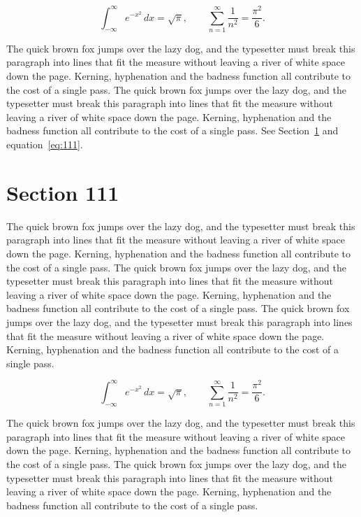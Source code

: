 \documentclass{article}
\begin{document}
\begin{equation}\label{eq:110}
\int_{-\infty}^{\infty} e^{-x^{2}}\,dx = \sqrt{\pi}, \qquad
\sum_{n=1}^{\infty} \frac{1}{n^{2}} = \frac{\pi^{2}}{6}.
\end{equation}

The quick brown fox jumps over the lazy dog, and the typesetter must break this paragraph into lines that fit the measure without leaving a river of white space down the page. Kerning, hyphenation and the badness function all contribute to the cost of a single pass. The quick brown fox jumps over the lazy dog, and the typesetter must break this paragraph into lines that fit the measure without leaving a river of white space down the page. Kerning, hyphenation and the badness function all contribute to the cost of a single pass. 
See Section~\ref{sec:111} and equation~\eqref{eq:111}.
\section{Section 111}
\label{sec:111}
The quick brown fox jumps over the lazy dog, and the typesetter must break this paragraph into lines that fit the measure without leaving a river of white space down the page. Kerning, hyphenation and the badness function all contribute to the cost of a single pass. The quick brown fox jumps over the lazy dog, and the typesetter must break this paragraph into lines that fit the measure without leaving a river of white space down the page. Kerning, hyphenation and the badness function all contribute to the cost of a single pass. The quick brown fox jumps over the lazy dog, and the typesetter must break this paragraph into lines that fit the measure without leaving a river of white space down the page. Kerning, hyphenation and the badness function all contribute to the cost of a single pass. 

\begin{equation}\label{eq:111}
\int_{-\infty}^{\infty} e^{-x^{2}}\,dx = \sqrt{\pi}, \qquad
\sum_{n=1}^{\infty} \frac{1}{n^{2}} = \frac{\pi^{2}}{6}.
\end{equation}

The quick brown fox jumps over the lazy dog, and the typesetter must break this paragraph into lines that fit the measure without leaving a river of white space down the page. Kerning, hyphenation and the badness function all contribute to the cost of a single pass. The quick brown fox jumps over the lazy dog, and the typesetter must break this paragraph into lines that fit the measure without leaving a river of white space down the page. Kerning, hyphenation and the badness function all contribute to the cost of a single pass. 
\end{document}
